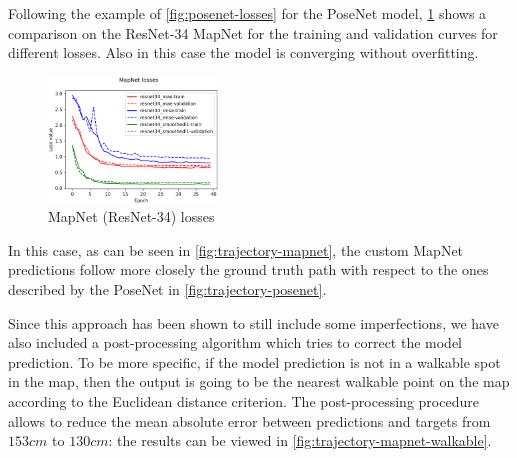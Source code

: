 Following the example of \cref{fig:posenet-losses} for the PoseNet model, \cref{fig:mapnet-losses} shows a comparison on the ResNet-34 MapNet for the training and validation curves for different losses. Also in this case the model is converging without overfitting.
\begin{figure}[htbp]
    \begin{center}
        \includegraphics[width=0.4\textwidth]{./imgs/mapnet_losses.png}
    \end{center}
    \caption{MapNet (ResNet-34) losses}
    \label{fig:mapnet-losses}
\end{figure}

In this case, as can be seen in \cref{fig:trajectory-mapnet}, the custom MapNet predictions follow more closely the ground truth path with respect to the ones described by the PoseNet in \cref{fig:trajectory-posenet}.

Since this approach has been shown to still include some imperfections, we have also included a post-processing algorithm which tries to correct the model prediction. To be more specific, if the model prediction is not in a walkable spot in the map, then the output is going to be the nearest walkable point on the map according to the Euclidean distance criterion. The post-processing procedure allows to reduce the mean absolute error between predictions and targets from $153 cm$ to $130 cm$: the results can be viewed in \cref{fig:trajectory-mapnet-walkable}.

